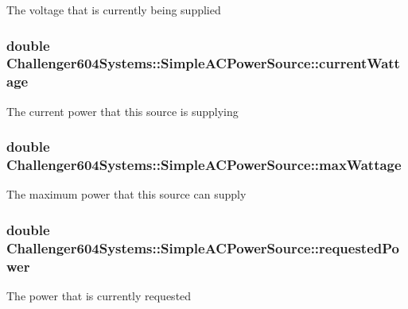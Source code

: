 The voltage that is currently being supplied \hypertarget{class_challenger604_systems_1_1_simple_a_c_power_source_a555e44c4500e6f094e9fb7ca17939648}{
\subsubsection[{current\-Wattage}]{\setlength{\rightskip}{0pt plus 5cm}double Challenger604\-Systems\-::\-Simple\-A\-C\-Power\-Source\-::current\-Wattage\hspace{0.3cm}{\ttfamily [protected]}}}\label{class_challenger604_systems_1_1_simple_a_c_power_source_a555e44c4500e6f094e9fb7ca17939648}
The current power that this source is supplying \hypertarget{class_challenger604_systems_1_1_simple_a_c_power_source_a52f945e3cf2a2ece8a3d9f772d5cddce}{
\subsubsection[{max\-Wattage}]{\setlength{\rightskip}{0pt plus 5cm}double Challenger604\-Systems\-::\-Simple\-A\-C\-Power\-Source\-::max\-Wattage\hspace{0.3cm}{\ttfamily [protected]}}}\label{class_challenger604_systems_1_1_simple_a_c_power_source_a52f945e3cf2a2ece8a3d9f772d5cddce}
The maximum power that this source can supply \hypertarget{class_challenger604_systems_1_1_simple_a_c_power_source_aeae97501266decbd321fe2a934d5f225}{
\subsubsection[{requested\-Power}]{\setlength{\rightskip}{0pt plus 5cm}double Challenger604\-Systems\-::\-Simple\-A\-C\-Power\-Source\-::requested\-Power\hspace{0.3cm}{\ttfamily [protected]}}}\label{class_challenger604_systems_1_1_simple_a_c_power_source_aeae97501266decbd321fe2a934d5f225}
The power that is currently requested 

